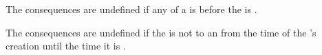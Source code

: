 \endsubSection%



The consequences are undefined if any  of a 
is  before the  is .

The consequences are undefined if the  is not 
to an   from the time of the 's creation
until the time it is .

\endsubSection%
